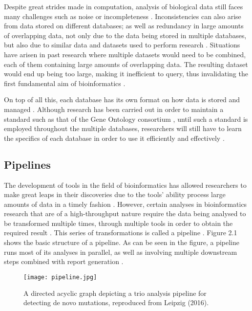 \documentclass{cisfyp}
\begin{document}
Despite great strides made in computation, analysis of biological data still faces many challenges such as noise or incompleteness \cite{yousef_allmer_2014}. Inconsistencies can also arise from data stored on different databases; as well as redundancy in large amounts of overlapping data, not only due to the data being stored in multiple databases, but also due to similar data and datasets used to perform research \cite{yousef_allmer_2014, zvelebil_baum_2008}. Situations have arisen in past research where multiple datasets would need to be combined, each of them containing large amounts of overlapping data. The resulting dataset would end up being too large, making it inefficient to query, thus invalidating the first fundamental aim of bioinformatics \cite{zvelebil_baum_2008}.

On top of all this, each database has its own format on how data is stored and managed \cite{yousef_allmer_2014}. Although research has been carried out in order to maintain a standard such as that of the Gene Ontology consortium \cite{Ashburner2000}, until such a standard is employed throughout the multiple databases, researchers will still have to learn the specifics of each database in order to use it efficiently and effectively \cite{zvelebil_baum_2008}.

\subsection{Pipelines}
The development of tools in the field of bioinformatics has allowed researchers to make great leaps in their discoveries due to the tools' ability process large amounts of data in a timely fashion \cite{tools_science}. However, certain analyses in bioinformatics research that are of a high-throughput nature require the data being analysed to be transformed multiple times, through multiple tools in order to obtain the required result \cite{Leipzig2016}. This series of transformations is called a pipeline \cite{Leipzig2016}. Figure 2.1 shows the basic structure of a pipeline. As can be seen in the figure, a pipeline runs most of its analyses in parallel, as well as involving multiple downstream steps combined with report generation \cite{Leipzig2016}.
\begin{figure}
	\texttt{[image: pipeline.jpg]}
	\caption{A directed acyclic graph depicting a trio analysis pipeline for detecting de novo mutations, reproduced from Leipzig (2016).}
	\label{fig:pipeline}
\end{figure}\pagebreak
\end{document}
